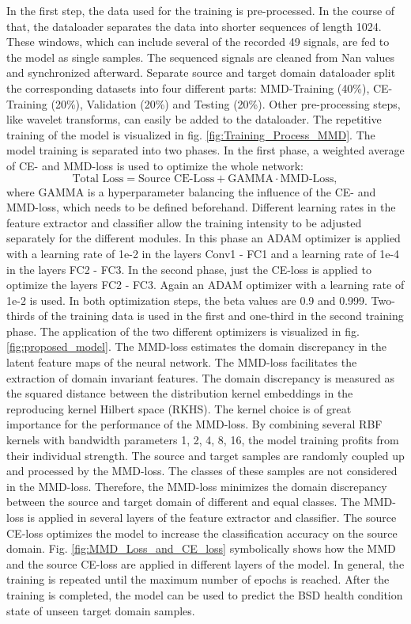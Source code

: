 In the first step, the data used for the training is pre-processed. In the course of that, the dataloader separates the data into shorter sequences of length 1024. These windows, which can include several of the recorded 49 signals, are fed to the model as single samples. The sequenced signals are cleaned from Nan values and synchronized afterward. Separate source and target domain dataloader split the corresponding datasets into four different parts: MMD-Training (40\%), CE-Training (20\%), Validation (20\%) and Testing (20\%). Other pre-processing steps, like wavelet transforms, can easily be added to the dataloader. The repetitive training of the model is visualized in fig. \ref{fig:Training_Process_MMD}. The model training is separated into two phases. In the first phase, a weighted average of CE- and MMD-loss is used to optimize the whole network: 
\begin{equation}
    \mbox{Total Loss} = \mbox{Source CE-Loss} + \mbox{GAMMA} \cdot \mbox{MMD-Loss}, 
\end{equation}
where GAMMA is a hyperparameter balancing the influence of the CE- and MMD-loss, which needs to be defined beforehand. Different learning rates in the feature extractor and classifier allow the training intensity to be adjusted separately for the different modules. In this phase an ADAM optimizer is applied with a learning rate of 1e-2 in the layers Conv1 - FC1 and a learning rate of 1e-4 in the layers FC2 - FC3. In the second phase, just the CE-loss is applied to optimize the layers FC2 - FC3. Again an ADAM optimizer with a learning rate of 1e-2 is used. In both optimization steps, the beta values are 0.9 and 0.999. Two-thirds of the training data is used in the first and one-third in the second training phase. The application of the two different optimizers is visualized in fig. \ref{fig:proposed_model}. The MMD-loss estimates the domain discrepancy in the latent feature maps of the neural network. The MMD-loss facilitates the extraction of domain invariant features. The domain discrepancy is measured as the squared distance between the distribution kernel embeddings in the reproducing kernel Hilbert space (RKHS). The kernel choice is of great importance for the performance of the MMD-loss. By combining several RBF kernels with bandwidth parameters 1, 2, 4, 8, 16, the model training profits from their individual strength. The source and target samples are randomly coupled up and processed by the MMD-loss. The classes of these samples are not considered in the MMD-loss. Therefore, the MMD-loss minimizes the domain discrepancy between the source and target domain of different and equal classes. The MMD-loss is applied in several layers of the feature extractor and classifier. The source CE-loss optimizes the model to increase the classification accuracy on the source domain. Fig. \ref{fig:MMD_Loss_and_CE_loss} symbolically shows how the MMD and the source CE-loss are applied in different layers of the model. In general, the training is repeated until the maximum number of epochs is reached. After the training is completed, the model can be used to predict the BSD health condition state of unseen target domain samples. 



